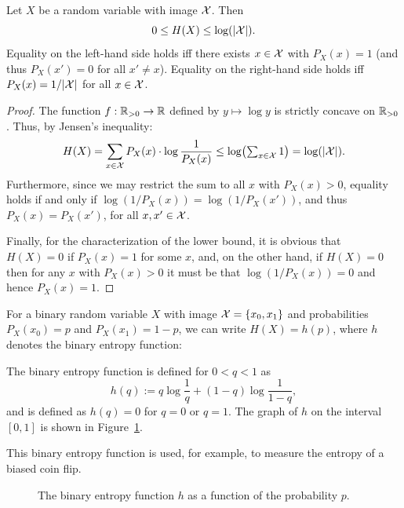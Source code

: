\begin{proposition}[Positivity]\label{prop:positivity}
Let $X$ be a random variable with image ${\cal X}$. Then
\[
0\leq H(X) \leq \log(|{\cal X}|).
\]
Equality on the left-hand side holds iff there exists $x\in {\cal
X}$ with $P_X(x)=1$ (and thus $P_X(x')=0$ for all $x' \neq x$). Equality on the right-hand side holds iff
$P_X(x)=1/|{\cal X}|$ for all $x\in {\cal X}$.
\end{proposition}

\begin{proof}
The function $f:
\mathbb{R}_{>0} \to \mathbb{R}$ defined by $y\mapsto \log y$ is strictly
 concave on $\mathbb{R}_{>0}$. Thus, by Jensen's inequality: 
\begin{align}
H(X)=\sum_{x\in {\cal X}} P_X(x) \cdot \log \frac{1}{P_X(x)}\leq
\log\bigl(\textstyle\sum_{x\in {\cal X}} 1\bigr)=\log(|{\cal X}|).
\end{align}
Furthermore, since we may restrict the sum to all $x$ with $P_X(x)>0$, equality holds if and only if  $\log(1/P_X(x)) = \log(1/P_X(x'))$, and thus $P_X(x) = P_X(x')$, for all $x,x' \in \cal X$. 

Finally, for the characterization of the lower bound, it is obvious that $H(X) = 0$ if $P_X(x) = 1$ for some $x$, and, on the other hand, if $H(X) = 0$ then for any $x$ with $P_X(x) > 0$ it must be that $\log(1/P_X(x)) = 0$ and hence $P_X(x) = 1$. 
\end{proof}

For a binary random variable $X$ with image ${\cal X} = \{x_0,x_1\}$ and probabilities $P_X(x_0) = p$ and $P_X(x_1) = 1-p$, we can write $H(X) = h(p)$, where $h$ denotes the binary entropy function:

\begin{definition}
The binary entropy function is defined for $0 < q < 1$ as 
\[
h(q) := q \log\frac{1}{q} + (1-q)\log\frac{1}{1-q},
\]
and is defined as $h(q) = 0$ for $q=0$ or $q=1$. The graph of $h$ on the interval $[0,1]$ is shown in Figure~\ref{fig:bin-entropy}.
\end{definition}
This binary entropy function is used, for example, to measure the entropy of a biased coin flip. 
\begin{figure}[h]
\centering{}
\caption{The binary entropy function $h$ as a function of the probability $p$.}\label{fig:bin-entropy}
\end{figure}

